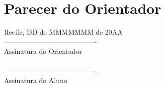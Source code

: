 \section{Parecer do Orientador}


\noindent Recife, DD  de MMMMMMM  de 20AA 
\\[1.5cm]
----------------------------------------\\
Assinatura do Orientador\\
\\[1.5cm]
----------------------------------------\\
Assinatura do Aluno